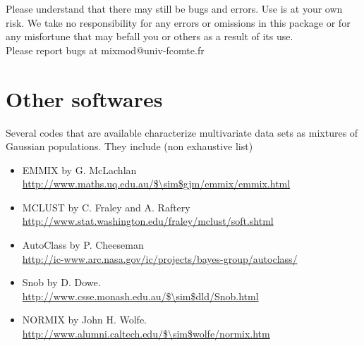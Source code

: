 Please understand that there may still be bugs and errors. Use is at your
own risk. We take no responsibility for any errors or omissions in this
package or for any misfortune that may befall you or others as a
result of its use.\\

Please report bugs at mixmod@univ-fcomte.fr

\section{Other softwares}
Several codes that are available characterize multivariate data sets as
mixtures of Gaussian populations. They include (non exhaustive list)
\begin{itemize}
   \item {\sc EMMIX} by G. McLachlan\\
    \url{http://www.maths.uq.edu.au/$\sim$gjm/emmix/emmix.html}
   \item {\sc MCLUST} by C. Fraley and A. Raftery\\
    \url{http://www.stat.washington.edu/fraley/mclust/soft.shtml}
   \item {\sc AutoClass} by P. Cheeseman\\
    \url{http://ic-www.arc.nasa.gov/ic/projects/bayes-group/autoclass/}
   \item {\sc Snob} by D. Dowe.\\
    \url{http://www.csse.monash.edu.au/$\sim$dld/Snob.html}
   \item {\sc NORMIX} by John H. Wolfe.\\
    \url{http://www.alumni.caltech.edu/$\sim$wolfe/normix.htm}
\end{itemize}
